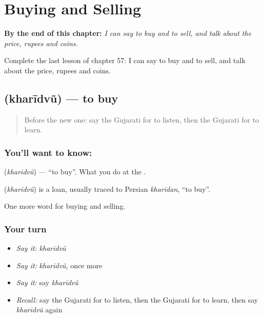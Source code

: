 
\chapter{Buying and Selling}
\label{ch:gu-buying-and-selling}

\begin{chapteropening}
\textbf{By the end of this chapter:} \emph{I can say to buy and to sell, and talk about the price, rupees and coins.}

Complete the last lesson of chapter 57: I can say to buy and to sell, and talk about the price, rupees and coins.
\end{chapteropening}

\section[\texorpdfstring{\gu{ખરીદવું} (kharīdvũ)}{ખરીદવું (kharīdvũ)}]{ (kharīdvũ) — to buy}

\label{lesson:GU-C57-kharidvu}



\begin{quote}
Before the new one: say the Gujarati for to listen, then the Gujarati for to learn.
\end{quote}

\subsection*{You'll want to know: }
\textbf{} (\emph{kharīdvũ}) — \textquotedblleft{}to buy\textquotedblright{}. What you do at the \textbf{}.

\begin{cousinweb}
\textbf{} (\emph{kharīdvũ}) is a loan, usually traced to Persian \emph{kharīdan}, \textquotedblleft{}to buy\textquotedblright{}.
\end{cousinweb}

\begin{grammarlens}[title={What you've built}]
One more word for buying and selling.
\end{grammarlens}

\subsection*{Your turn}
\begin{itemize}
\raggedright
  \item \emph{Say it:} \emph{kharīdvũ}
  \item \emph{Say it:} \emph{kharīdvũ}, once more
  \item \emph{Say it:} say \emph{kharīdvũ}
  \item \emph{Recall:} say the Gujarati for to listen, then the Gujarati for to learn, then say \emph{kharīdvũ} again
\end{itemize}


